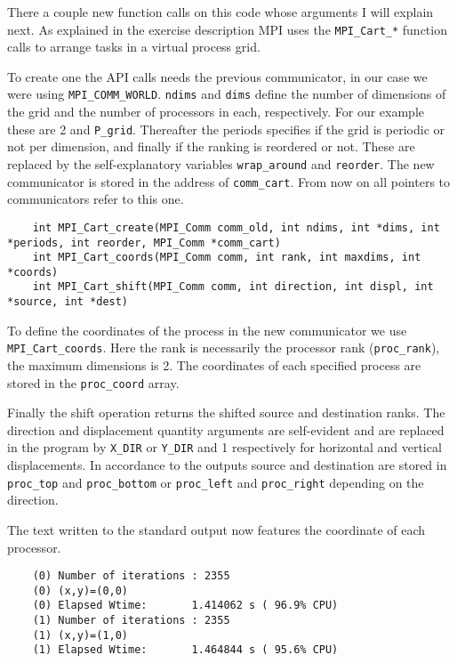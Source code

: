 There a couple new function calls on this code whose arguments I will explain next.
As explained in the exercise description MPI uses the \texttt{MPI\_Cart\_*} function calls to arrange tasks in a virtual process grid.

To create one the API calls needs the previous communicator, in our case we were using \texttt{MPI\_COMM\_WORLD}. \texttt{ndims} and \texttt{dims} define the number of dimensions of the grid and the number of processors in each, respectively. For our example these are 2 and \texttt{P\_grid}. Thereafter the periods specifies if the grid is periodic or not per dimension, and finally if the ranking is reordered or not. These are replaced by the self-explanatory variables \texttt{wrap\_around} and \texttt{reorder}. The new communicator is stored in the address of \texttt{comm\_cart}. From now on all pointers to communicators refer to this one.

\begin{lstlisting}
	int MPI_Cart_create(MPI_Comm comm_old, int ndims, int *dims, int *periods, int reorder, MPI_Comm *comm_cart)
	int MPI_Cart_coords(MPI_Comm comm, int rank, int maxdims, int *coords)
	int MPI_Cart_shift(MPI_Comm comm, int direction, int displ, int *source, int *dest)
\end{lstlisting}

To define the coordinates of the process in the new communicator we use \texttt{MPI\_Cart\_coords}. Here the rank is necessarily the processor rank (\texttt{proc\_rank}), the maximum dimensions is 2. The coordinates of each specified process are stored in the \texttt{proc\_coord} array.

Finally the shift operation returns the shifted source and destination ranks. The direction and displacement quantity arguments are self-evident and are replaced in the program by \texttt{X\_DIR} or \texttt{Y\_DIR} and 1 respectively for horizontal and vertical displacements. In accordance to the outputs source and destination are stored in \texttt{proc\_top} and \texttt{proc\_bottom} or \texttt{proc\_left} and \texttt{proc\_right} depending on the direction. 


The text written to the standard output now features the coordinate of each processor.

\begin{lstlisting}
	(0) Number of iterations : 2355
	(0) (x,y)=(0,0)
	(0) Elapsed Wtime:       1.414062 s ( 96.9% CPU)
	(1) Number of iterations : 2355
	(1) (x,y)=(1,0)
	(1) Elapsed Wtime:       1.464844 s ( 95.6% CPU)
\end{lstlisting}

